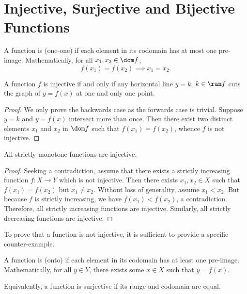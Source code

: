 \section{Injective, Surjective and Bijective Functions}

\begin{definition}
    A function is  (one-one) if each element in its codomain has at most one pre-image. Mathematically, for all $x_1, x_2 \in \dom f$, \[f(x_1) = f(x_2) \implies x_1 = x_2.\]
\end{definition}

\begin{proposition}
    A function $f$ is injective if and only if any horizontal line $y = k$, $k \in \ran f$ cuts the graph of $y = f(x)$ at one and only one point.
\end{proposition}
\begin{proof}
    We only prove the backwards case as the forwards case is trivial. Suppose $y = k$ and $y = f(x)$ intersect more than once. Then there exist two distinct elements $x_1$ and $x_2$ in $\dom f$ such that $f(x_1) = f(x_2)$, whence $f$ is not injective.
\end{proof}

\begin{proposition}
    All strictly monotone functions are injective.
\end{proposition}
\begin{proof}
    Seeking a contradiction, assume that there exists a strictly increasing function $f : X \to Y$ which is not injective. Then there exists $x_1, x_2 \in X$ such that $f(x_1) = f(x_2)$ but $x_1 \neq x_2$. Without loss of generality, assume $x_1 < x_2$. But because $f$ is strictly increasing, we have $f(x_1) < f(x_2)$, a contradiction. Therefore, all strictly increasing functions are injective. Similarly, all strictly decreasing functions are injective.
\end{proof}

To prove that a function is not injective, it is sufficient to provide a specific counter-example.

\begin{definition}
    A function is  (onto) if each element in its codomain has at least one pre-image. Mathematically, for all $y \in Y$, there exists some $x \in X$ such that $y = f(x)$.
\end{definition}

Equivalently, a function is surjective if its range and codomain are equal.

